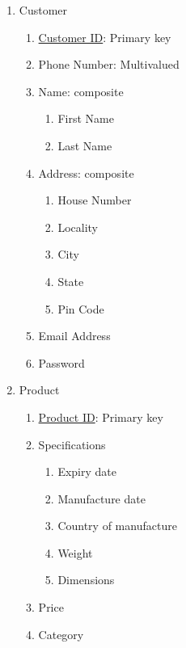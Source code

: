 \documentclass[12pt]{report}
\begin{document}
    \begin{enumerate}
        \item Customer
            \begin{enumerate}
                \item \underline{Customer ID}: Primary key
                \item Phone Number: Multivalued
                \item Name: composite
                    \begin{enumerate}
                        \item First Name
                        \item Last Name
                    \end{enumerate}
                \item Address: composite
                    \begin{enumerate}
                        \item House Number
                        \item Locality
                        \item City
                        \item State
                        \item Pin Code
                    \end{enumerate}
                \item Email Address
                \item Password
            \end{enumerate}
        \item Product
            \begin{enumerate}
                \item \underline{Product ID}: Primary key
                \item Specifications
                    \begin{enumerate}
                        \item Expiry date
                        \item Manufacture date
                        \item Country of manufacture
                        \item Weight 
                        \item Dimensions
                    \end{enumerate}
                \item Price
                \item Category

\end{enumerate}
\end{enumerate}
\end{document}
